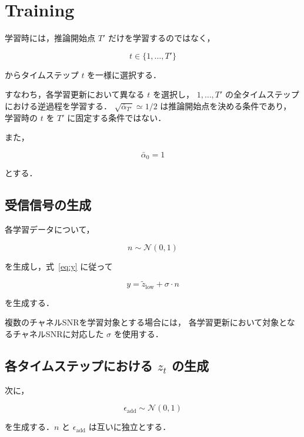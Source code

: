 \documentclass[a4paper,10pt,twocolumn]{ltjsarticle}
\begin{document}

\section{Training}

学習時には，推論開始点 $T'$ だけを学習するのではなく，

\begin{equation}
t\in\{1,\ldots,T'\}
\label{eq:t_range}
\end{equation}

からタイムステップ $t$ を一様に選択する．

すなわち，各学習更新において異なる $t$ を選択し，
$1,\ldots,T'$ の全タイムステップにおける逆過程を学習する．
$\sqrt{\bar{\alpha}_{T'}}\simeq 1/2$ は推論開始点を決める条件であり，
学習時の $t$ を $T'$ に固定する条件ではない．

また，

\begin{equation}
\bar{\alpha}_0=1
\label{eq:alpha_zero}
\end{equation}

とする．

\subsection{受信信号の生成}

各学習データについて，

\[
n\sim\mathcal{N}(0,1)
\]

を生成し，式~\eqref{eq:y} に従って

\begin{equation}
y
=
\tilde z_{\mathrm{low}}
+
\sigma\cdot n
\label{eq:y_training}
\end{equation}

を生成する．

複数のチャネルSNRを学習対象とする場合には，
各学習更新において対象となるチャネルSNRに対応した
$\sigma$ を使用する．

\subsection{各タイムステップにおける $z_t$ の生成}

次に，

\[
\epsilon_{\mathrm{add}}
\sim
\mathcal{N}(0,1)
\]

を生成する．$n$ と $\epsilon_{\mathrm{add}}$ は互いに独立とする．
\end{document}
